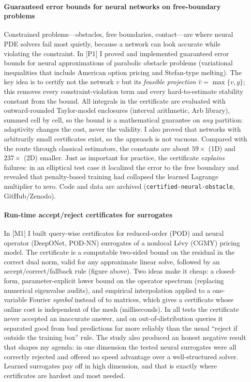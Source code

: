 \documentclass[11pt]{article}
\newcommand{\rc}[1]{\textcolor{accent}{[#1]}}
\begin{document}
\paragraph{Guaranteed error bounds for neural networks on free-boundary problems}
Constrained problems---obstacles, free boundaries, contact---are where neural
PDE solvers fail most quietly, because a network can look accurate while
violating the constraint. In \rc{P1} I proved and implemented
guaranteed error bounds for neural approximations of parabolic obstacle
problems (variational inequalities that include American option pricing and
Stefan-type melting). The key idea is to certify not the network $v$ but its
\emph{feasible projection} $\hat v=\max\{v,g\}$; this removes every
constraint-violation term and every hard-to-estimate stability constant from
the bound. All integrals in the certificate are evaluated with outward-rounded
Taylor-model enclosures (interval arithmetic, Arb library), summed cell by cell, so the bound is a
mathematical guarantee on \emph{any} partition: adaptivity changes the cost,
never the validity. I also proved that networks with arbitrarily small
certificates exist, so the approach is not vacuous. Compared with the route
through classical estimators, the constants are about $59\times$ (1D) and
$237\times$ (2D) smaller. Just as important for practice, the certificate
\emph{explains} failures: in an elliptical test case it localized the error to
the free boundary and revealed that penalty-based training had collapsed the
learned Lagrange multiplier to zero. Code and data are archived
(\texttt{certified-neural-obstacle}, GitHub/Zenodo).

\paragraph{Run-time accept/reject certificates for surrogates}
In \rc{M1} I built query-wise certificates for reduced-order (POD) and neural
operator (DeepONet, POD-NN) surrogates of a nonlocal L\'evy (CGMY) pricing
model. The certificate is a computable two-sided bound on the residual in the
correct dual norm, valid for any approximate linear solve, followed by an
accept/correct/fallback rule (figure above). Two ideas make it cheap: a
closed-form, parameter-explicit lower bound on the operator spectrum
(replacing numerical eigenvalue audits), and empirical interpolation applied
to a one-variable Fourier \emph{symbol} instead of to matrices, which gives a
certificate whose online cost is independent of the mesh (milliseconds). In
all tests the certificate never accepted an inaccurate answer, and on
out-of-distribution queries it separated good from bad predictions far more
reliably than the usual ``reject if outside the training box'' rule.
The study also produced an honest negative result that shapes my agenda: in
one dimension the tested neural surrogates were all correctly rejected and
offered no speed advantage over a well-structured solver. Learned surrogates
pay off in high dimension, and that is exactly where certificates are hardest
and most needed.
\end{document}
